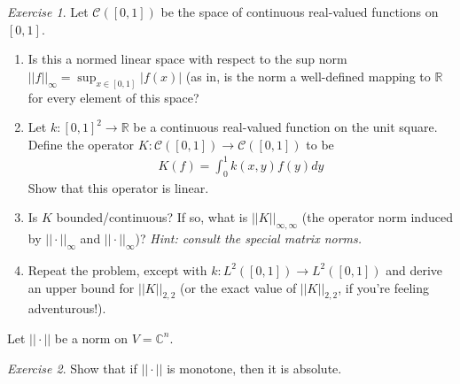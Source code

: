 \documentclass[11pt]{article}
\newcommand{\R}{\ensuremath{\mathbb R}}
\newcommand{\C}{\ensuremath{\mathbb C}}
\theoremstyle{plain}
\theoremstyle{definition}
\theoremstyle{remark}
\newtheorem{exc}{Exercise}[section]
\begin{document}
\begin{exc}
    Let $\mathcal{C}([0,1])$ be the space of continuous real-valued functions on $[0,1]$.
    \begin{enumerate}
        \item Is this a normed linear space with respect to the sup norm $||f||_{\infty} = \sup_{x \in [0,1]} |f(x)|$ (as in, is the norm a well-defined mapping to $\R$ for every element of this space?
        \item Let $k: [0,1]^2 \rightarrow \R$ be a continuous real-valued function on the unit square. Define the operator $K: \mathcal{C}([0,1]) \rightarrow \mathcal{C}([0,1])$ to be
        \begin{align*}
            K(f) = \int_{0}^1 k(x, y) f(y) dy
        \end{align*}
        Show that this operator is linear.
        \item Is $K$ bounded/continuous? If so, what is $||K||_{\infty, \infty}$ (the operator norm induced by $||\cdot||_{\infty}$ and $||\cdot||_{\infty}$)? {\it Hint: consult the special matrix norms.}
        \item Repeat the problem, except with $k: L^2([0,1]) \rightarrow L^2([0,1])$ and derive an upper bound for $||K||_{2,2}$ (or the exact value of $||K||_{2,2}$, if you're feeling adventurous!).
    \end{enumerate}
\end{exc}

Let $||\cdot||$ be a norm on $V = \C^n$.

\begin{exc}
    Show that if $||\cdot||$ is monotone, then it is absolute.
\end{exc}
\end{document}
